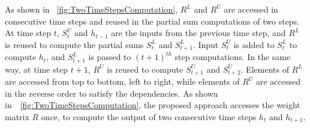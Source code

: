 \documentclass[a4paper,10pt]{article}
\begin{document}
As shown in \figurename{~\ref{fig:TwoTimeStepsComputation}}, $R^L$ and $R^U$ are accessed in consecutive time steps and reused in the partial sum computations of two steps. At time step $t$, $S_t^U$ and $h_{t-1}$ are the inputs from the previous time step, and $R^L$ is reused to compute the partial sums $S_{t}^{L}$ and $S_{t+1}^L$. Input $S_{t}^{U}$ is added to $S_{t}^{L}$ to compute $h_{t}$, and $S_{t+1}^L$ is passed to $(t{+}1)^{th}$ step computations.
In the same way, at time step $t{+}1$, $R^U$ is reused to compute $S_{t+1}^{U}$ and $S_{t+2}^{U}$. Elements of $R^L$ are accessed from top to bottom, left to right, while elements of $R^U$ are accessed in the reverse order to satisfy the dependencies. As shown in~\figurename{~\ref{fig:TwoTimeStepsComputation}}, the proposed approach accesses the weight matrix $R$ once, to compute the output of two consecutive time steps $h_{t}$ and $h_{t+1}$. 
\end{document}
